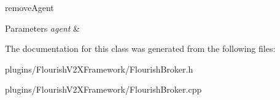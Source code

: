 remove\+Agent 


\begin{DoxyParams}{Parameters}
{\em agent} & \\
\hline
\end{DoxyParams}


The documentation for this class was generated from the following files\+:\begin{DoxyCompactItemize}
\item 
plugins/\+Flourish\+V2\+X\+Framework/Flourish\+Broker.\+h\item 
plugins/\+Flourish\+V2\+X\+Framework/Flourish\+Broker.\+cpp\end{DoxyCompactItemize}
